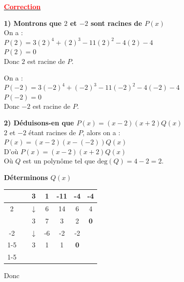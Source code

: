 \documentclass[12pt,a4paper]{article}
\begin{document}
\begin{center}
    \textbf{\underline{\textcolor{red}{Correction}}}
\end{center}

\noindent \textbf{1) Montrons que $2$ et $-2$ sont racines de $P(x)$} \\
On a : \\
$P(2) = 3(2)^4 + (2)^3 - 11(2)^2 - 4(2) - 4$ \\
$P(2) = 0$ \\
Donc $2$ est racine de $P$.

\vspace{0.5em}

\noindent On a : \\
$P(-2) = 3(-2)^4 + (-2)^3 - 11(-2)^2 - 4(-2) - 4$ \\
$P(-2) = 0$ \\
Donc $-2$ est racine de $P$.

\vspace{1em}

\noindent \textbf{2) Déduisons-en que $P(x) = (x-2)(x+2)Q(x)$} \\
$2$ et $-2$ étant racines de $P$, alors on a : \\
$P(x) = (x-2)(x-(-2))Q(x)$ \\
D'où $P(x) = (x-2)(x+2)Q(x)$ \\
Où $Q$ est un polynôme tel que $\text{deg}(Q) = 4 - 2 = 2$.

\vspace{1em}

\noindent \textbf{Déterminons $Q(x)$} \\
\begin{center}
\renewcommand{\arraystretch}{1.5}
\begin{tabular}{|c|c|c|c|c|c|c|}
\hline
& & 3 & 1 & -11 & -4 & -4 \\ \hline
2 & & $\downarrow$ & 6 & 14 & 6 & 4 \\ \hline
& & 3 & 7 & 3 & 2 & \textbf{0} \\ \hline
-2 & & $\downarrow$ & -6 & -2 & -2 & \multicolumn{1}{c}{} \\ \cline{1-5}
& & 3 & 1 & 1 & \textbf{0} & \multicolumn{1}{c}{} \\ \cline{1-5}
\end{tabular}
\end{center}

\vspace{1em}

\noindent Donc 
\end{document}

